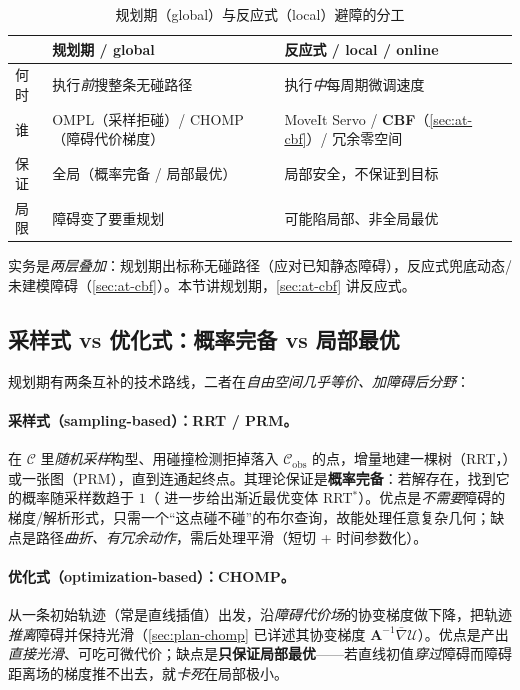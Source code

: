 \begin{table}[H]\centering\small
\caption{规划期（global）与反应式（local）避障的分工}
\label{tab:at-twolayer}
\begin{tabular}{p{} p{} p{}}
\toprule
& 规划期 / global & 反应式 / local / online \\
\midrule
何时 & 执行\emph{前}搜整条无碰路径 & 执行\emph{中}每周期微调速度 \\
谁 & OMPL（采样拒碰）/ CHOMP（障碍代价梯度） & MoveIt Servo / \textbf{CBF}（\cref{sec:at-cbf}）/ 冗余零空间 \\
保证 & 全局（概率完备 / 局部最优） & 局部安全，不保证到目标 \\
局限 & 障碍变了要重规划 & 可能陷局部、非全局最优 \\
\bottomrule
\end{tabular}
\end{table}

实务是\emph{两层叠加}：规划期出标称无碰路径（应对已知静态障碍），反应式兜底动态/未建模障碍（\cref{sec:at-cbf}）。本节讲规划期，\cref{sec:at-cbf} 讲反应式。

\subsection{采样式 vs 优化式：概率完备 vs 局部最优}
\label{subsec:at-sampling-vs-opt}

规划期有两条互补的技术路线，二者在\emph{自由空间几乎等价、加障碍后分野}：

\paragraph{采样式（sampling-based）：RRT / PRM。}
在 $\mathcal{C}$ 里\emph{随机采样}构型、用碰撞检测拒掉落入 $\mathcal{C}_{\mathrm{obs}}$ 的点，增量地建一棵树（RRT，\cite{kuffner2000rrtconnect}）或一张图（PRM），直到连通起终点。其理论保证是\textbf{概率完备}：若解存在，找到它的概率随采样数趋于 $1$（\cite{karaman2011sampling} 进一步给出渐近最优变体 RRT$^*$）。优点是\emph{不需要}障碍的梯度/解析形式，只需一个“这点碰不碰”的布尔查询，故能处理任意复杂几何；缺点是路径\emph{曲折、有冗余动作}，需后处理平滑（短切 + 时间参数化）。

\paragraph{优化式（optimization-based）：CHOMP。}
从一条初始轨迹（常是直线插值）出发，沿\emph{障碍代价场}的协变梯度做下降，把轨迹\emph{推离}障碍并保持光滑（\cref{sec:plan-chomp} 已详述其协变梯度 $\mathbf{A}^{-1}\bar\nabla\mathcal{U}$）。优点是产出\emph{直接光滑}、可吃可微代价；缺点是\textbf{只保证局部最优}——若直线初值\emph{穿过}障碍而障碍距离场的梯度推不出去，就\emph{卡死}在局部极小。

